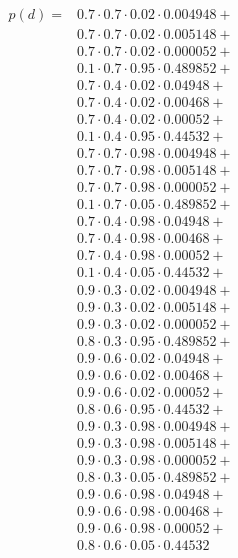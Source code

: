 \documentclass[12pt]{report}
\begin{document}
\begin{align*}    
    p(d) = 
    & 0.7 \cdot 0.7 \cdot  0.02 \cdot 0.004948 + \\
    & 0.7 \cdot 0.7 \cdot  0.02 \cdot 0.005148 + \\
    & 0.7 \cdot 0.7 \cdot  0.02 \cdot 0.000052 + \\
    & 0.1 \cdot 0.7 \cdot  0.95 \cdot 0.489852 + \\
    & 0.7 \cdot 0.4 \cdot  0.02 \cdot 0.04948  + \\
    & 0.7 \cdot 0.4 \cdot  0.02 \cdot 0.00468  + \\
    & 0.7 \cdot 0.4 \cdot  0.02 \cdot 0.00052  + \\
    & 0.1 \cdot 0.4 \cdot  0.95 \cdot 0.44532  + \\
    & 0.7 \cdot 0.7 \cdot  0.98 \cdot 0.004948 + \\
    & 0.7 \cdot 0.7 \cdot  0.98 \cdot 0.005148 + \\
    & 0.7 \cdot 0.7 \cdot  0.98 \cdot 0.000052 + \\
    & 0.1 \cdot 0.7 \cdot  0.05 \cdot 0.489852 + \\
    & 0.7 \cdot 0.4 \cdot  0.98 \cdot 0.04948  + \\
    & 0.7 \cdot 0.4 \cdot  0.98 \cdot 0.00468  + \\
    & 0.7 \cdot 0.4 \cdot  0.98 \cdot 0.00052  + \\
    & 0.1 \cdot 0.4 \cdot  0.05 \cdot 0.44532  + \\   
    & 0.9 \cdot 0.3 \cdot  0.02 \cdot 0.004948 + \\
    & 0.9 \cdot 0.3 \cdot  0.02 \cdot 0.005148 + \\
    & 0.9 \cdot 0.3 \cdot  0.02 \cdot 0.000052 + \\
    & 0.8 \cdot 0.3 \cdot  0.95 \cdot 0.489852 + \\
    & 0.9 \cdot 0.6 \cdot  0.02 \cdot 0.04948  + \\
    & 0.9 \cdot 0.6 \cdot  0.02 \cdot 0.00468  + \\
    & 0.9 \cdot 0.6 \cdot  0.02 \cdot 0.00052  + \\
    & 0.8 \cdot 0.6 \cdot  0.95 \cdot 0.44532  + \\
    & 0.9 \cdot 0.3 \cdot  0.98 \cdot 0.004948 + \\
    & 0.9 \cdot 0.3 \cdot  0.98 \cdot 0.005148 + \\
    & 0.9 \cdot 0.3 \cdot  0.98 \cdot 0.000052 + \\
    & 0.8 \cdot 0.3 \cdot  0.05 \cdot 0.489852 + \\
    & 0.9 \cdot 0.6 \cdot  0.98 \cdot 0.04948  + \\
    & 0.9 \cdot 0.6 \cdot  0.98 \cdot 0.00468  + \\
    & 0.9 \cdot 0.6 \cdot  0.98 \cdot 0.00052  + \\
    & 0.8 \cdot 0.6 \cdot  0.05 \cdot 0.44532
\end{align*}
\end{document}
